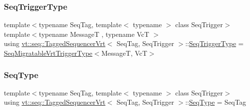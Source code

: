 \mbox{\label{structvt_1_1seq_1_1_tagged_sequencer_vrt_a04f34e1c279e29fd32af152ccf8dcf99}} 
\subsubsection{\texorpdfstring{Seq\+Trigger\+Type}{SeqTriggerType}}
{\footnotesize\ttfamily template$<$typename Seq\+Tag, template$<$ typename $>$ class Seq\+Trigger$>$ \\
template$<$typename MessageT , typename VcT $>$ \\
using \hyperlink{structvt_1_1seq_1_1_tagged_sequencer_vrt}{vt\+::seq\+::\+Tagged\+Sequencer\+Vrt}$<$ Seq\+Tag, Seq\+Trigger $>$\+::\hyperlink{structvt_1_1seq_1_1_tagged_sequencer_a4b015f2f7d3197a66af5576f0e63a834}{Seq\+Trigger\+Type} =  \hyperlink{namespacevt_1_1seq_a4147691d837ca54f178a5f1c49effc6f}{Seq\+Migratable\+Vrt\+Trigger\+Type}$<$MessageT, VcT$>$}

\mbox{\label{structvt_1_1seq_1_1_tagged_sequencer_vrt_a254c920e4553310411a15c7d64c1b6c1}} 
\subsubsection{\texorpdfstring{Seq\+Type}{SeqType}}
{\footnotesize\ttfamily template$<$typename Seq\+Tag, template$<$ typename $>$ class Seq\+Trigger$>$ \\
using \hyperlink{structvt_1_1seq_1_1_tagged_sequencer_vrt}{vt\+::seq\+::\+Tagged\+Sequencer\+Vrt}$<$ Seq\+Tag, Seq\+Trigger $>$\+::\hyperlink{structvt_1_1seq_1_1_tagged_sequencer_a1c8ee839258d0f88c49ef660267a81d5}{Seq\+Type} =  Seq\+Tag}

\mbox{\label{structvt_1_1seq_1_1_tagged_sequencer_vrt_a19c5f10f5710fee8cd202735af8aa17f}} 
